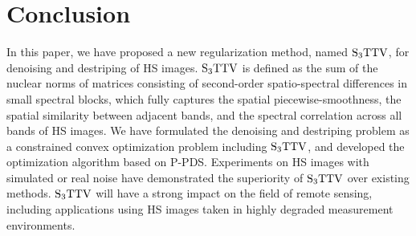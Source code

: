 \documentclass[10pt,journal]{IEEEtran}
\begin{document}
\section{Conclusion}
\label{sec:conclusion}
In this paper, we have proposed a new regularization method, named ${\text{S}_{3} \text{TTV}}$, for denoising and destriping of HS images.
${\text{S}_{3} \text{TTV}}$ is defined as the sum of the nuclear norms of matrices consisting of second-order spatio-spectral differences in small spectral blocks, which fully captures the spatial piecewise-smoothness, the spatial similarity between adjacent bands, and the spectral correlation across all bands of HS images.
We have formulated the denoising and destriping problem as a constrained convex optimization problem including ${\text{S}_{3} \text{TTV}}$, and developed the optimization algorithm based on P-PDS. 
Experiments on HS images with simulated or real noise have demonstrated the superiority of ${\text{S}_{3} \text{TTV}}$ over existing methods. 
${\text{S}_{3} \text{TTV}}$ will have a strong impact on the field of remote sensing, including applications using HS images taken in highly degraded measurement environments.








\end{document}
